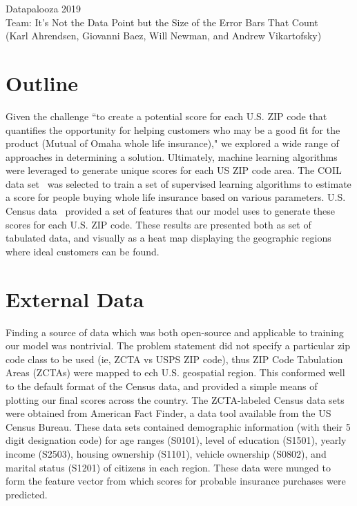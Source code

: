 \documentclass[12pt]{article}
\begin{document}
\begin{center}
Datapalooza 2019\\
\vspace{0.15cm}
Team: It's Not the Data Point but the Size of the Error Bars That Count\\
\vspace{0.15cm}
(Karl Ahrendsen, Giovanni Baez, Will Newman, and Andrew Vikartofsky)
\end{center}

\section{Outline}
Given the challenge ``to create a potential score for each U.S. ZIP code that quantifies the opportunity for helping customers who may be a good fit for the product (Mutual of Omaha whole life insurance)," we explored a wide range of approaches in determining a solution.  Ultimately, machine learning algorithms were leveraged to generate unique scores for each US ZIP code area.  The COIL data set~\cite{COIL} was selected to train a set of supervised learning algorithms to estimate a score for people buying whole life insurance based on various parameters.  U.S. Census data~\cite{Census} provided a set of features that our model uses to generate these scores for each U.S. ZIP code.  These results are presented both as set of tabulated data, and visually as a heat map displaying the geographic regions where ideal customers can be found.

\section{External Data}
Finding a source of data which was both open-source and applicable to training our model was nontrivial.  The problem statement did not specify a particular zip code class to be used (ie, ZCTA vs USPS ZIP code), thus ZIP Code Tabulation Areas (ZCTAs) were mapped to ech U.S. geospatial region.  This conformed well to the default format of the Census data, and provided a simple means of plotting our final scores across the country.  The ZCTA-labeled Census data sets were obtained from American Fact Finder, a data tool available from the US Census Bureau.  These data sets contained demographic information (with their 5 digit designation code) for age ranges (S0101), level of education (S1501), yearly income (S2503), housing ownership (S1101), vehicle ownership (S0802), and marital status (S1201) of citizens in each region.  These data were munged to form the feature vector from which scores for probable insurance purchases were predicted.
\end{document}
